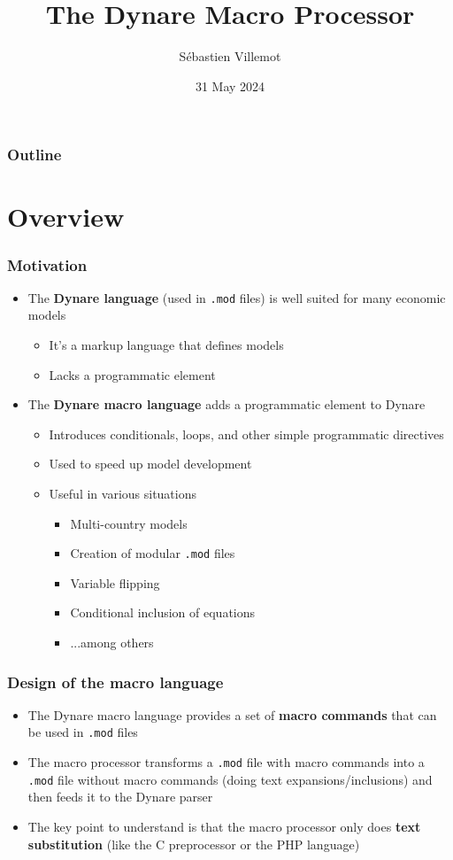 \documentclass[aspectratio=169]{beamer}
\title{The Dynare Macro Processor}
\author{Sébastien Villemot}
\institute[Dynare Team]{\pgfuseimage{logo}}
\date{31 May 2024}
\begin{document}
\begin{frame}
  \titlepage
\end{frame}

\begin{frame}
  \frametitle{Outline}
  \tableofcontents
\end{frame}

\section{Overview}

\begin{frame}
  \frametitle{Motivation}
  \begin{itemize}
  \item The \textbf{Dynare language} (used in \texttt{.mod} files) is well suited for many economic models
    \begin{itemize}
    \item It's a markup language that defines models
    \item Lacks a programmatic element
    \end{itemize}
  \item The \textbf{Dynare macro language} adds a programmatic element to Dynare
    \begin{itemize}
    \item Introduces conditionals, loops, and other simple programmatic directives
    \item Used to speed up model development
    \item Useful in various situations
      \begin{itemize}
      \item Multi-country models
      \item Creation of modular \texttt{.mod} files
      \item Variable flipping
      \item Conditional inclusion of equations
      \item ...among others
      \end{itemize}
    \end{itemize}
  \end{itemize}
\end{frame}

\begin{frame}
  \frametitle{Design of the macro language}
  \begin{itemize}
  \item The Dynare macro language provides a set of \textbf{macro commands} that can be used in \texttt{.mod} files
  \item The macro processor transforms a \texttt{.mod} file with macro commands into a \texttt{.mod} file without macro commands (doing text expansions/inclusions) and then feeds it to the Dynare parser
  \item The key point to understand is that the macro processor only does \textbf{text substitution} (like the C preprocessor or the PHP language)
  \end{itemize}
\end{frame}
\end{document}
